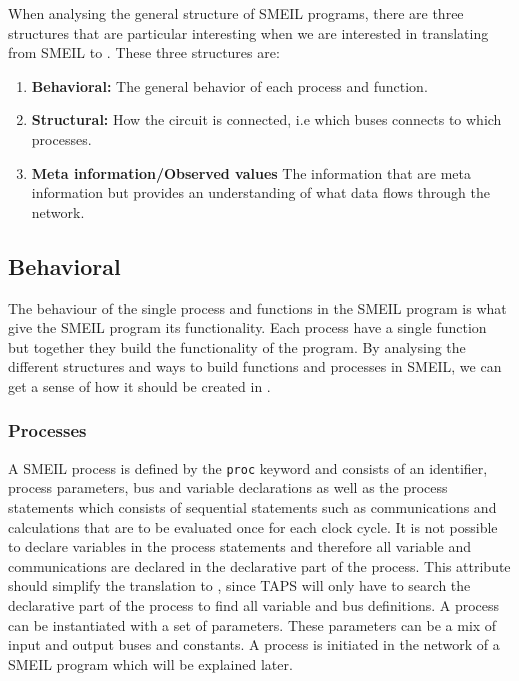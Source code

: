 When analysing the general structure of SMEIL programs, there are three structures that are particular interesting when we are interested in translating from SMEIL to \cspm{}. These three structures are:
\begin{enumerate}
    \item \textbf{Behavioral:} The general behavior of each process and function.
    \item \textbf{Structural:} How the circuit is connected, i.e which buses connects to which processes.
    \item \textbf{Meta information/Observed values} %
    The information that are meta information but provides an understanding of what data flows through the network.
\end{enumerate}


\subsection{Behavioral}
The behaviour of the single process and functions in the SMEIL program is what give the SMEIL program its functionality. Each process have a single function but together they build the functionality of the program. By analysing the different structures and ways to build functions and processes in SMEIL, we can get a sense of how it should be created in \cspm.

\subsubsection{Processes}

A SMEIL process is defined by the \texttt{proc} keyword and consists of an identifier, process parameters, bus and variable declarations as well as the process statements which consists of sequential statements such as communications and calculations that are to be evaluated once for each clock cycle.
It is not possible to declare variables in the process statements and therefore all variable and communications are declared in the declarative part of the process. This attribute should simplify the translation to \cspm, since TAPS will only have to search the declarative part of the process to find all variable and bus definitions.
A process can be instantiated with a set of parameters. These parameters can be a mix of input and output buses and constants. A process is initiated in the network of a SMEIL program which will be explained later.

